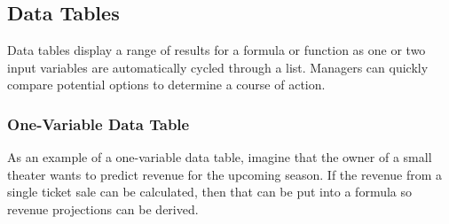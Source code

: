 \subsection{Data Tables}

Data tables display a range of results for a formula or function as one or two input variables are automatically cycled through a list. Managers can quickly compare potential options to determine a course of action.

\subsubsection{One-Variable Data Table}

As an example of a one-variable data table, imagine that the owner of a small theater wants to predict revenue for the upcoming season. If the revenue from a single ticket sale can be calculated, then that can be put into a formula so revenue projections can be derived.

